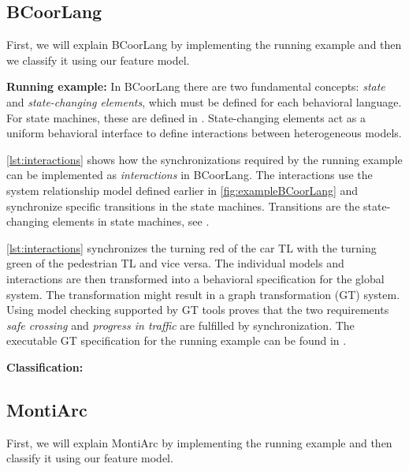\documentclass[runningheads]{llncs}
\begin{document}
\subsection{BCoorLang}
First, we will explain BCoorLang by implementing the running example and then we classify it using our feature model.

\textbf{Running example:} In BCoorLang there are two fundamental concepts: \textit{state} and \textit{state-changing elements}, which must be defined for each behavioral language.
For state machines, these are defined in \cite{krauterBehavioralConsistencyMultimodeling2023}.
State-changing elements act as a uniform behavioral interface to define interactions between heterogeneous models.

\autoref{lst:interactions} shows how the synchronizations required by the running example can be implemented as \textit{interactions} in BCoorLang.
The interactions use the system relationship model defined earlier in \autoref{fig:exampleBCoorLang} and synchronize specific transitions in the state machines.
Transitions are the state-changing elements in state machines, see  \cite{krauterBehavioralConsistencyMultimodeling2023}.



\autoref{lst:interactions} synchronizes the turning red of the car TL with the turning green of the pedestrian TL and vice versa.
The individual models and interactions are then transformed into a behavioral specification for the global system.
The transformation might result in a graph transformation (GT) system.
Using model checking supported by GT tools proves that the two requirements \textit{safe crossing} and \textit{progress in traffic} are fulfilled by synchronization.
The executable GT specification for the running example can be found in \cite{timkrauterArtifactsCoordination2024}.

\textbf{Classification:} 

\subsection{MontiArc} \label{subsec:montiArc}
First, we will explain MontiArc by implementing the running example and then classify it using our feature model.
\end{document}
